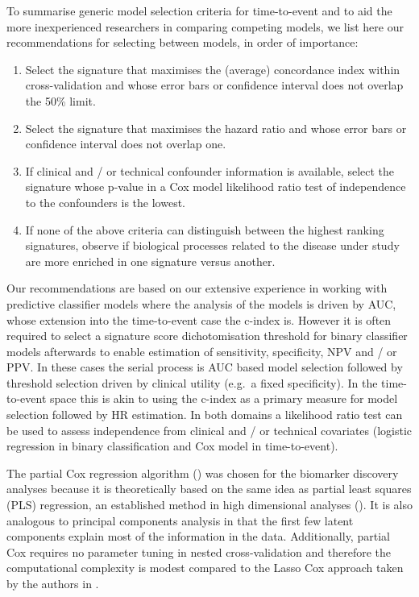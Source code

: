 \documentclass[letterpaper,12pt]{article}
\begin{document}
To summarise generic model selection criteria for time-to-event and to aid the more inexperienced researchers in comparing competing models, we list here our recommendations for selecting between models, in order of importance:
\begin{enumerate}
  \item Select the signature that maximises the (average) concordance index within cross-validation and whose error bars or confidence interval does not overlap the 50\% limit.
  \item Select the signature that maximises the hazard ratio and whose error bars or confidence interval does not overlap one. 
  \item If clinical and / or technical confounder information is available, select the signature whose p-value in a Cox model likelihood ratio test of independence to the confounders is the lowest.
  \item If none of the above criteria can distinguish between the highest ranking signatures, observe if biological processes related to the disease under study are more enriched in one signature versus another.
\end{enumerate}
Our recommendations are based on our extensive experience in working with predictive classifier models where the analysis of the models is driven by AUC, whose extension into the time-to-event case the c-index is. However it is often required to select a signature score dichotomisation threshold for binary classifier models afterwards to enable estimation of sensitivity, specificity, NPV and / or PPV. In these cases the serial process is AUC based model selection followed by threshold selection driven by clinical utility (e.g.\ a fixed specificity). In the time-to-event space this is akin to using the c-index as a primary measure for model selection followed by HR estimation. In both domains a likelihood ratio test can be used to assess independence from clinical and / or technical covariates (logistic regression in binary classification and Cox model in time-to-event). 

The partial Cox regression algorithm (\citet{Li:04}) was chosen for the biomarker discovery analyses because it is theoretically based on the same idea as partial least squares (PLS) regression, an established method in high dimensional analyses (\citet{Boulesteix:06}). It is also analogous to principal components analysis in that the first few latent components explain most of the information in the data. Additionally, partial Cox requires no parameter tuning in nested cross-validation and therefore the computational complexity is modest compared to the Lasso Cox approach taken by the authors in \citet{Kammers:11}. 
\end{document}
